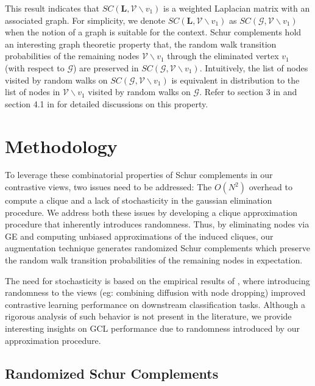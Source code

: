 \documentclass{article}
\def\mL{{\mathbf{L}}}
\def\gG{{\mathcal{G}}}
\def\gV{{\mathcal{V}}}
\theoremstyle{plain}
\theoremstyle{definition}
\theoremstyle{remark}
\begin{document}
This result indicates that $SC(\mL, \gV \backslash v_1)$ is a weighted Laplacian matrix with an associated graph. For simplicity, we denote $SC(\mL, \gV \backslash v_1)$ as $SC(\gG, \gV \backslash v_1)$ when the notion of a graph is suitable for the context. Schur complements hold an interesting graph theoretic property that, the random walk transition probabilities of the remaining nodes $\gV \backslash v_1$ through the eliminated vertex $v_1$ (with respect to $\gG$) are preserved in $SC(\gG, \gV \backslash v_1)$. Intuitively, the list of nodes visited by random walks on $SC(\gG, \gV \backslash v_1)$ is equivalent in distribution to the list of nodes in $\gV \backslash v_1$ visited by random walks on $\gG$. Refer to section 3 in \citet{durfee2019fully} and section 4.1 in \citet{gao2022fully} for detailed discussions on this property.

\section{Methodology}

To leverage these combinatorial properties of Schur complements in our contrastive views, two issues need to be addressed: The $O(N^2)$ overhead to compute a clique and a lack of stochasticity in the gaussian elimination procedure. We address both these issues by developing a clique approximation procedure that inherently introduces randomness. Thus, by eliminating nodes via GE and computing unbiased approximations of the induced cliques, our augmentation technique generates randomized Schur complements which preserve the random walk transition probabilities of the remaining nodes in expectation.

The need for stochasticity is based on the empirical results of \citet{zhu2021empirical}, where introducing randomness to the views (eg: combining diffusion with node dropping) improved contrastive learning performance on downstream classification tasks. Although a rigorous analysis of such behavior is not present in the literature, we provide interesting insights on GCL performance due to randomness introduced by our approximation procedure.






\subsection{Randomized Schur Complements}
\end{document}
